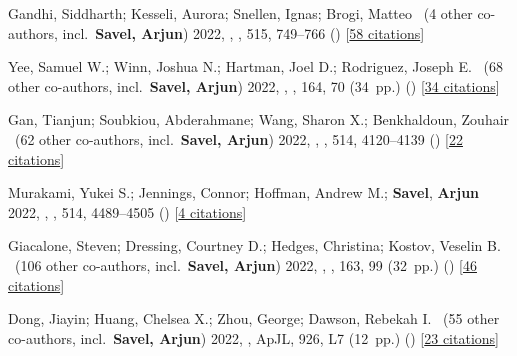 \item[{\color{numcolor}\scriptsize12}] Gandhi, Siddharth; Kesseli, Aurora; Snellen, Ignas; Brogi, Matteo \etal{}\ ({4} other co-authors, incl.\ \textbf{Savel, Arjun}) 2022, , \mnras, {515}, 749--766 () [\href{https://ui.adsabs.harvard.edu/abs/2022MNRAS.515..749G}{58 citations}]

\item[{\color{numcolor}\scriptsize11}] Yee, Samuel W.; Winn, Joshua N.; Hartman, Joel D.; Rodriguez, Joseph E. \etal{}\ ({68} other co-authors, incl.\ \textbf{Savel, Arjun}) 2022, , \aj, {164}, 70 (34~pp.) () [\href{https://ui.adsabs.harvard.edu/abs/2022AJ....164...70Y}{34 citations}]

\item[{\color{numcolor}\scriptsize10}] Gan, Tianjun; Soubkiou, Abderahmane; Wang, Sharon X.; Benkhaldoun, Zouhair \etal{}\ ({62} other co-authors, incl.\ \textbf{Savel, Arjun}) 2022, , \mnras, {514}, 4120--4139 () [\href{https://ui.adsabs.harvard.edu/abs/2022MNRAS.514.4120G}{22 citations}]

\item[{\color{numcolor}\scriptsize9}] Murakami, Yukei S.; Jennings, Connor; Hoffman, Andrew M.; \textbf{Savel}, \textbf{Arjun} \etal{} 2022, , \mnras, {514}, 4489--4505 () [\href{https://ui.adsabs.harvard.edu/abs/2022MNRAS.514.4489M}{4 citations}]

\item[{\color{numcolor}\scriptsize8}] Giacalone, Steven; Dressing, Courtney D.; Hedges, Christina; Kostov, Veselin B. \etal{}\ ({106} other co-authors, incl.\ \textbf{Savel, Arjun}) 2022, , \aj, {163}, 99 (32~pp.) () [\href{https://ui.adsabs.harvard.edu/abs/2022AJ....163...99G}{46 citations}]

\item[{\color{numcolor}\scriptsize7}] Dong, Jiayin; Huang, Chelsea X.; Zhou, George; Dawson, Rebekah I. \etal{}\ ({55} other co-authors, incl.\ \textbf{Savel, Arjun}) 2022, , ApJL, {926}, L7 (12~pp.) () [\href{https://ui.adsabs.harvard.edu/abs/2022ApJ...926L...7D}{23 citations}]

